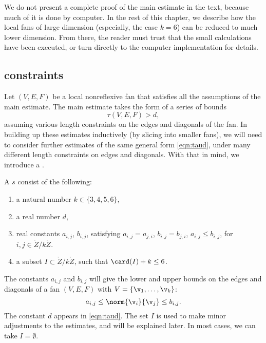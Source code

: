 We do not present a complete proof of the main estimate in the text,
because much of it is done by computer.  In the rest of this chapter,
we describe how the local fans of large dimension (especially, the case $k=6$)
can be reduced to much lower dimension.  From there, the reader must
trust that the small calculations have been executed, or turn directly to
the computer implementation for details.

\subsection{constraints}

Let $(V,E,F)$ be a local nonreflexive fan that satisfies all the assumptions
of the main estimate.  The main estimate takes the form of a series of
bounds
\begin{equation}\label{eqn:taud}
\tau(V,E,F) > d,
\end{equation}
assuming various length constraints on the edges and diagonals of the fan.
In building up these estimates inductively (by slicing into
smaller fans), we will need to consider further estimates of the same
general form \eqref{eqn:taud}, under many different length constraints on
edges and diagonals.
With that in mind, we introduce a .

\begin{definition}
A  $s$ consist of the following:
\begin{enumerate}
\item a natural number $k\in \{3,4,5,6\}$,
\item a real number $d$,
\item real constants $a_{i,j}$, $b_{i,j}$,  satisfying
   $a_{i,j} = a_{j,i}$, $b_{i,j}=b_{j,i}$, $a_{i,j}\le b_{i,j}$, for $i,j\in\ring{Z}/k\ring{Z}$.
\item a subset $I\subset \ring{Z}/k\ring{Z}$, such that $\card(I)+k\le 6$.
\end{enumerate}
\end{definition}

The constants $a_{i,j}$ and $b_{i,j}$ will give the lower and upper bounds
on the edges and diagonals of a fan $(V,E,F)$ with $V=\{\v_1,\ldots,\v_k\}$:
\[
a_{i,j}\le \norm{\v_i}{\v_j} \le b_{i,j}.
\]
The constant $d$ appears in \eqref{eqn:taud}.    The set $I$ is used to
make minor adjustments to the estimates, and will be explained later.
In most cases, we can take $I=\emptyset$.

